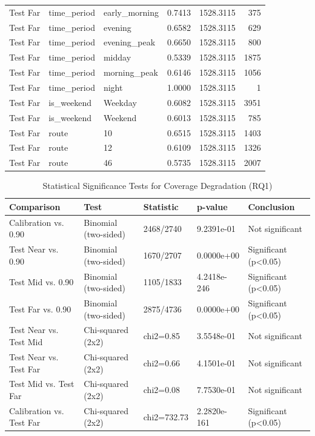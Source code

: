 \begin{table}
\begin{tabular}{lllrrr}
Test Far & time_period & early_morning & 0.7413 & 1528.3115 & 375 \\
Test Far & time_period & evening & 0.6582 & 1528.3115 & 629 \\
Test Far & time_period & evening_peak & 0.6650 & 1528.3115 & 800 \\
Test Far & time_period & midday & 0.5339 & 1528.3115 & 1875 \\
Test Far & time_period & morning_peak & 0.6146 & 1528.3115 & 1056 \\
Test Far & time_period & night & 1.0000 & 1528.3115 & 1 \\
Test Far & is_weekend & Weekday & 0.6082 & 1528.3115 & 3951 \\
Test Far & is_weekend & Weekend & 0.6013 & 1528.3115 & 785 \\
Test Far & route & 10 & 0.6515 & 1528.3115 & 1403 \\
Test Far & route & 12 & 0.6109 & 1528.3115 & 1326 \\
Test Far & route & 46 & 0.5735 & 1528.3115 & 2007 \\
\bottomrule
\end{tabular}
\end{table}



\begin{table}
\caption{Statistical Significance Tests for Coverage Degradation (RQ1)}
\label{tab:t4_4_significance}
\begin{tabular}{lllll}
\toprule
Comparison & Test & Statistic & p-value & Conclusion \\
\midrule
Calibration vs. 0.90 & Binomial (two-sided) & 2468/2740 & 9.2391e-01 & Not significant \\
Test Near vs. 0.90 & Binomial (two-sided) & 1670/2707 & 0.0000e+00 & Significant (p<0.05) \\
Test Mid vs. 0.90 & Binomial (two-sided) & 1105/1833 & 4.2418e-246 & Significant (p<0.05) \\
Test Far vs. 0.90 & Binomial (two-sided) & 2875/4736 & 0.0000e+00 & Significant (p<0.05) \\
Test Near vs. Test Mid & Chi-squared (2x2) & chi2=0.85 & 3.5548e-01 & Not significant \\
Test Near vs. Test Far & Chi-squared (2x2) & chi2=0.66 & 4.1501e-01 & Not significant \\
Test Mid vs. Test Far & Chi-squared (2x2) & chi2=0.08 & 7.7530e-01 & Not significant \\
Calibration vs. Test Far & Chi-squared (2x2) & chi2=732.73 & 2.2820e-161 & Significant (p<0.05) \\
\bottomrule
\end{tabular}
\end{table}



